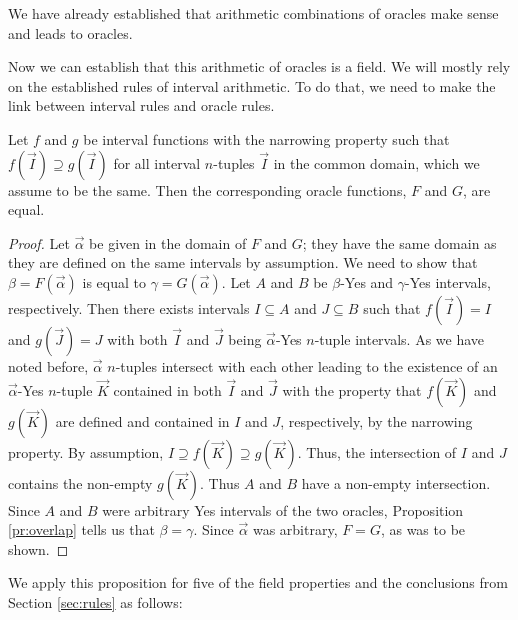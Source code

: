 \documentclass[12pt]{article}
\begin{document}
We have already established that arithmetic combinations of oracles make sense and leads to oracles. 


Now we can establish that this arithmetic of oracles is a field. We will mostly rely on the established rules of interval arithmetic. To do that, we need to make the link between interval rules and oracle rules. 


\begin{proposition}
Let $f$ and $g$ be interval functions with the narrowing property such that $f(\vec{I}) \supseteq g(\vec{I})$ for all interval $n$-tuples $\vec{I}$ in the common domain, which we assume to be the same. Then the corresponding oracle functions, $F$ and $G$, are equal.  
\end{proposition}

\begin{proof}
Let $\vec{\alpha}$ be given in the domain of $F$ and $G$; they have the same domain as they are defined on the same intervals by assumption. We need to show that $\beta = F(\vec{\alpha})$ is equal to $\gamma =  G(\vec{\alpha})$. Let $A$ and $B$ be $\beta$-Yes and $\gamma$-Yes intervals, respectively. Then there exists intervals $I \subseteq A$ and  $J \subseteq B$  such that $f(\vec{I}) = I$ and $g(\vec{J}) = J$ with both  $\vec{I}$ and $\vec{J}$ being $\vec{\alpha}$-Yes $n$-tuple intervals. As we have noted before, $\vec{\alpha}$ $n$-tuples intersect with each other leading to the existence of an $\vec{\alpha}$-Yes $n$-tuple $\vec{K}$ contained in both $\vec{I}$ and $\vec{J}$ with the property that $f(\vec{K})$ and $g(\vec{K})$ are defined and contained in $I$ and $J$, respectively, by the narrowing property. By assumption, $I \supseteq f(\vec{K}) \supseteq g(\vec{K})$. Thus, the intersection of $I$ and $J$ contains the non-empty $g(\vec{K})$. Thus $A$ and $B$ have a non-empty intersection. Since $A$ and $B$ were arbitrary Yes intervals of the two oracles, Proposition \ref{pr:overlap} tells us that $\beta = \gamma$. Since $\vec{\alpha}$ was arbitrary, $F = G$, as was to be shown.
\end{proof}

We apply this proposition for five of the field properties and the conclusions from Section \ref{sec:rules} as follows: 
\end{document}
